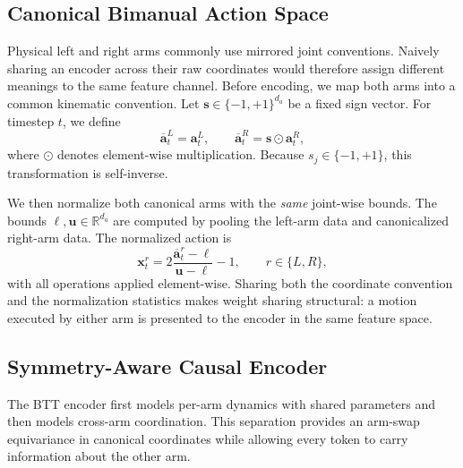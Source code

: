 \subsection{Canonical Bimanual Action Space}
\label{sec:btt_canonicalization}

Physical left and right arms commonly use mirrored joint conventions.  Naively
sharing an encoder across their raw coordinates would therefore assign
different meanings to the same feature channel.  Before encoding, we map both
arms into a common kinematic convention.  Let
$\mathbf{s}\in\{-1,+1\}^{d_a}$ be a fixed sign vector.  For timestep $t$, we
define
\begin{equation}
    \overline{\mathbf{a}}^{L}_{t}=\mathbf{a}^{L}_{t},
    \qquad
    \overline{\mathbf{a}}^{R}_{t}
    =\mathbf{s}\odot\mathbf{a}^{R}_{t},
    \label{eq:btt_canonicalization}
\end{equation}
where $\odot$ denotes element-wise multiplication.  Because
$s_j\in\{-1,+1\}$, this transformation is self-inverse.

We then normalize both canonical arms with the \emph{same} joint-wise bounds.
The bounds $\boldsymbol{\ell},\mathbf{u}\in\mathbb{R}^{d_a}$ are computed by
pooling the left-arm data and canonicalized right-arm data.  The normalized
action is
\begin{equation}
    \mathbf{x}^{r}_{t}
    = 2\frac{\overline{\mathbf{a}}^{r}_{t}-\boldsymbol{\ell}}
             {\mathbf{u}-\boldsymbol{\ell}}-1,
    \qquad r\in\{L,R\},
    \label{eq:btt_normalization}
\end{equation}
with all operations applied element-wise.  Sharing both the coordinate
convention and the normalization statistics makes weight sharing structural:
a motion executed by either arm is presented to the encoder in the same
feature space.

\subsection{Symmetry-Aware Causal Encoder}
\label{sec:btt_encoder}

The BTT encoder first models per-arm dynamics with shared parameters and then
models cross-arm coordination.  This separation provides an arm-swap
equivariance in canonical coordinates while allowing every token to carry
information about the other arm.

